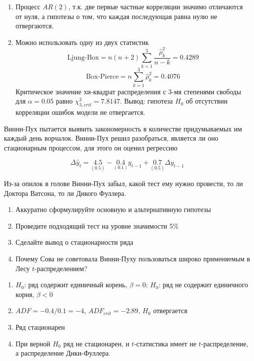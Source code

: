 \documentclass[pdftex,11pt,openany]{book}\usepackage[]{graphicx}\usepackage[]{color}
\begin{document}
\begin{solution}
\begin{enumerate}
\item Процесс $AR(2)$, т.к. две первые частные корреляции значимо отличаются от нуля, а гипотезы о том, что каждая последующая равна нулю не отвергаются.
\item Можно использовать одну из двух статистик
\[
\text{Ljung-Box}=n(n+2)\sum_{k=1}^3\frac{\hat{\rho}_k^2}{n-k}=
0.4289
\]
\[
\text{Box-Pierce}=n\sum_{k=1}^3\hat{\rho}_k^2=
0.4076
\]
Критическое значение хи-квадрат распределения с 3-мя степенями свободы для $\alpha=0.05$ равно $\chi^2_{3,crit}=7.8147$.
Вывод: гипотеза $H_0$ об отсутствии корреляции ошибок модели не отвергается.
\end{enumerate}
\end{solution}





\begin{problem}
Винни-Пух пытается выявить закономерность в количестве придумываемых им каждый день ворчалок.  Винни-Пух решил разобраться, является ли оно стационарным процессом, для этого он оценил регрессию

\[ \Delta \hat{y}_t = \underset{(0.5)}{4.5} - \underset{(0.1)}{0.4}y_{t-1} +\underset{(0.5)}{0.7} \Delta y_{t-1} \]

Из-за опилок в голове Винни-Пух забыл, какой тест ему нужно провести, то ли Доктора Ватсона, то ли Дикого Фуллера. 

\begin{enumerate}
\item Аккуратно сформулируйте основную и альтернативную гипотезы
\item Проведите подходящий тест на уровне значимости 5\%
\item Сделайте вывод о стационарности ряда
\item Почему Сова не советовала Винни-Пуху пользоваться широко применяемым в Лесу $t$-распределением?
\end{enumerate}
\end{problem}

\begin{solution}



\begin{enumerate}
\item $H_0$: ряд содержит единичный корень, $\beta=0$; $H_0$: ряд не содержит единичного корня, $\beta<0$
\item $ADF=-0.4/0.1=-4$, $ADF_{crit}=\ensuremath{-2.89}$, $H_0$ отвергается
\item Ряд стационарен
\item При верной $H_0$ ряд не стационарен, и  $t$-статистика имеет не $t$-распределение, а распределение Дики-Фуллера.
\end{enumerate}
\end{solution}
\end{document}
